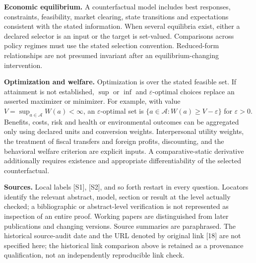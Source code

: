 \documentclass[11pt,a4paper]{article}
\begin{document}
\textbf{Economic equilibrium.} A counterfactual model includes best responses, constraints, feasibility, market clearing, state transitions and expectations consistent with the stated information. When several equilibria exist, either a declared selector is an input or the target is set-valued. Comparisons across policy regimes must use the stated selection convention. Reduced-form relationships are not presumed invariant after an equilibrium-changing intervention.

\textbf{Optimization and welfare.} Optimization is over the stated feasible set. If attainment is not established, $\sup$ or $\inf$ and $\varepsilon$-optimal choices replace an asserted maximizer or minimizer. For example, with value $V=\sup_{a\in\mathcal A}W(a)<\infty$, an $\varepsilon$-optimal set is $\{a\in\mathcal A:W(a)\geq V-\varepsilon\}$ for $\varepsilon>0$. Benefits, costs, risk and health or environmental outcomes can be aggregated only using declared units and conversion weights. Interpersonal utility weights, the treatment of fiscal transfers and foreign profits, discounting, and the behavioral welfare criterion are explicit inputs. A comparative-static derivative additionally requires existence and appropriate differentiability of the selected counterfactual.

\textbf{Sources.} Local labels [S1], [S2], and so forth restart in every question. Locators identify the relevant abstract, model, section or result at the level actually checked; a bibliographic or abstract-level verification is not represented as inspection of an entire proof. Working papers are distinguished from later publications and changing versions. Source summaries are paraphrased. The historical source-audit date and the URL denoted by original link [18] are not specified here; the historical link comparison above is retained as a provenance qualification, not an independently reproducible link check.
\end{document}
